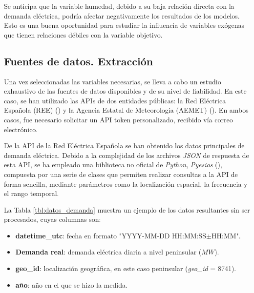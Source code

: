 \documentclass[12pt,a4paper]{report}
\begin{document}
Se anticipa que la variable humedad, debido a su baja relación directa con la demanda eléctrica, podría afectar negativamente los resultados de los modelos. Esto es una buena oportunidad para estudiar la influencia de variables exógenas que tienen relaciones débiles con la variable objetivo.

\subsection{Fuentes de datos. Extracción}

Una vez seleccionadas las variables necesarias, se lleva a cabo un estudio exhaustivo de las fuentes de datos disponibles y de su nivel de fiabilidad. En este caso, se han utilizado las APIs de dos entidades públicas: la Red Eléctrica Española (REE) (\cite{reeAPI}) y la Agencia Estatal de Meteorología (AEMET) (\cite{aemetAPI}). En ambos casos, fue necesario solicitar un API token personalizado, recibido vía correo electrónico.

De la API de la Red Eléctrica Española se han obtenido los datos principales de demanda eléctrica. Debido a la complejidad de los archivos \textit{JSON} de respuesta de esta API, se ha empleado una biblioteca no oficial de \textit{Python}, \textit{Pyesios} (\cite{pyesios}), compuesta por una serie de clases que permiten realizar consultas a la API de forma sencilla, mediante parámetros como la localización espacial, la frecuencia y el rango temporal.

La Tabla \ref{tbl:datos_demanda} muestra un ejemplo de los datos resultantes sin ser procesados, cuyas columnas son:

\begin{itemize}
    \item \textbf{datetime\_utc}: fecha en formato "YYYY-MM-DD HH:MM:SS$\pm$HH:MM".

    \item \textbf{Demanda real}: demanda eléctrica diaria a nivel peninsular ($MW$).

    \item \textbf{geo\_id}: localización geográfica, en este caso peninsular (\textit{geo\_id} = 8741).

    \item \textbf{año}: año en el que se hizo la medida.
\end{itemize}
\end{document}
